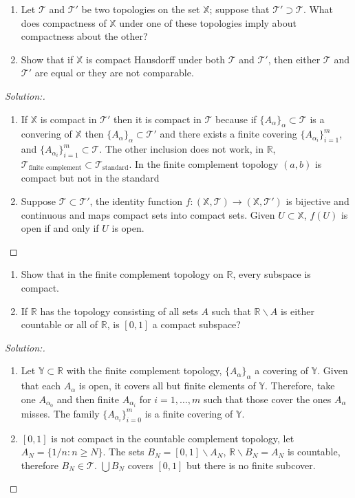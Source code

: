 \documentclass[a4paper,12pt, reqno]{article}
\theoremstyle{definition}
\newenvironment{exerr}[1]{
  \renewcommand\theexeralt{#1}
  \exeralt
}{\endexeralt}
\newenvironment{solution}{\begin{proof}[Solution:]}{\end{proof}}
\newcommand{\R}{\mathbb{R}}
\newcommand{\T}{\mathscr{T}}
\newcommand{\X}{\mathbb{X}}
\newcommand{\Y}{\mathbb{Y}}
\begin{document}
\begin{exerr}{1}\hfill
  \begin{enumerate}[label=(\alph*)]
    \item Let $\T$ and $\T'$ be two topologies on the set $\X$; suppose that $\T'\supset\T$. What does compactness of $\X$ under one of these topologies imply about compactness about the other?
    \item Show that if $\X$ is compact Hausdorff under both $\T$ and $\T'$, then either $\T$ and $\T'$ are equal or they are not comparable.
  \end{enumerate}
\end{exerr}
\begin{solution}\hfill
  \begin{enumerate}[label=(\alph*)]
    \item If $\X$ is compact in $\T'$ then it is compact in $\T$ because if $\{ A_{\alpha} \}_{\alpha}\subset\T$ is a convering of $\X$ then $\{ A_{\alpha} \}_{\alpha}\subset\T'$ and there exists a finite covering $\{ A_{\alpha_{i}} \}_{i=1}^m$, and $\{ A_{\alpha_{i}} \}_{i=1}^m\subset\T$. The other inclusion does not work, in $\R$, $\T_{\text{finite complement}}\subset\T_{\text{standard}}$. In the finite complement topology $(a,b)$ is compact but not in the standard
    \item Suppose $\T\subset\T'$, the identity function $f:(\X,\T)\to(\X,\T')$ is bijective and continuous and maps compact sets into compact sets. Given $U\subset\X$, $f(U)$ is open if and only if $U$ is open.
  \end{enumerate}
\end{solution}

\begin{exerr}{2}\hfill
  \begin{enumerate}[label=(\alph*)]
    \item Show that in the finite complement topology on $\R$, every subspace is compact.
    \item If $\R$ has the topology consisting of all sets $A$ such that $\R\backslash A$ is either countable or all of $\R$, is $[0,1]$ a compact subspace?
  \end{enumerate}
\end{exerr}
\begin{solution}
  \begin{enumerate}[label=(\alph*)]
    \item Let $\Y\subset\R$ with the finite complement topology, $\{ A_{\alpha} \}_{\alpha}$ a covering of $\Y$. Given that each $A_{\alpha}$ is open, it covers all but finite elements of $\Y$. Therefore, take one $A_{\alpha_{0}}$ and then finite $A_{\alpha_{i}}$ for $i=1,\dots,m$ such that those cover the ones $A_{\alpha}$ misses. The family $\{ A_{\alpha_{i}} \}_{i=0}^m$ is a finite covering of $\Y$.
    \item $[0,1]$ is not compact in the countable complement topology, let $A_{N} = \{ 1/n : n\geq N \}$. The sets $B_{N}=[0,1]\backslash A_{N}$, $\R\backslash B_{N} = A_{N}$ is countable, therefore $B_{N}\in\T$. $\bigcup B_{N}$ covers $[0,1]$ but there is no finite subcover.
  \end{enumerate}
\end{solution}
\end{document}

